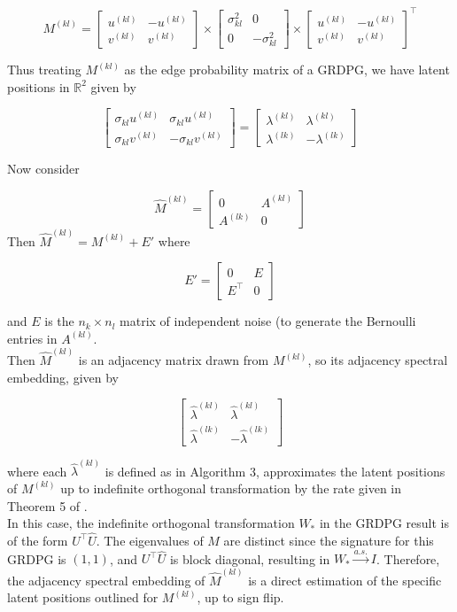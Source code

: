 \documentclass[
  12pt,
]{article}
\begin{document}
\[M^{(kl)} = 
\begin{bmatrix} u^{(kl)} & -u^{(kl)} \\ v^{(kl)} & v^{(kl)} \end{bmatrix} \times 
\begin{bmatrix} \sigma^2_{kl} & 0 \\ 0 & -\sigma^2_{kl} \end{bmatrix} \times
\begin{bmatrix} u^{(kl)} & -u^{(kl)} \\ v^{(kl)} & v^{(kl)} \end{bmatrix}^\top\]

Thus treating \(M^{(kl)}\) as the edge probability matrix of a GRDPG, we
have latent positions in \(\mathbb{R}^2\) given by

\[\begin{bmatrix} 
  \sigma_{kl} u^{(kl)} & \sigma_{kl} u^{(kl)} \\ 
  \sigma_{kl} v^{(kl)} & -\sigma_{kl} v^{(kl)} 
\end{bmatrix} = 
\begin{bmatrix} 
  \lambda^{(kl)} & \lambda^{(kl)} \\ 
  \lambda^{(lk)} & -\lambda^{(lk)} 
\end{bmatrix}\]

Now consider

\[\hat{M}^{(kl)} = \begin{bmatrix} 0 & A^{(kl)} \\ A^{(lk)} & 0 \end{bmatrix}\]
Then \(\hat{M}^{(kl)} = M^{(kl)} + E'\) where

\[E' = \begin{bmatrix} 0 & E \\ E^\top & 0 \end{bmatrix}\]

and \(E\) is the \(n_k \times n_l\) matrix of independent noise (to
generate the Bernoulli entries in \(A^{(kl)}\).\\
Then \(\hat{M}^{(kl)}\) is an adjacency matrix drawn from \(M^{(kl)}\),
so its adjacency spectral embedding, given by

\[\begin{bmatrix} 
  \hat{\lambda}^{(kl)} & \hat{\lambda}^{(kl)} \\ 
  \hat{\lambda}^{(lk)} & -\hat{\lambda}^{(lk)} 
\end{bmatrix}\]

where each \(\hat{\lambda}^{(kl)}\) is defined as in Algorithm 3,
approximates the latent positions of \(M^{(kl)}\) up to indefinite
orthogonal transformation by the rate given in Theorem 5 of
\citeauthor{rubindelanchy2017statistical}.\\
In this case, the indefinite orthogonal transformation \(W_*\) in the
GRDPG result \cite{rubindelanchy2017statistical} is of the form
\(U^\top \hat{U}\). The eigenvalues of \(M\) are distinct since the
signature for this GRDPG is \((1, 1)\), and \(U^\top \hat{U}\) is block
diagonal, resulting in \(W_* \stackrel{a.s.}{\to} I\). Therefore, the
adjacency spectral embedding of \(\hat{M}^{(kl)}\) is a direct
estimation of the specific latent positions outlined for \(M^{(kl)}\),
up to sign flip.

\renewcommand\refname{References}
  
\end{document}

